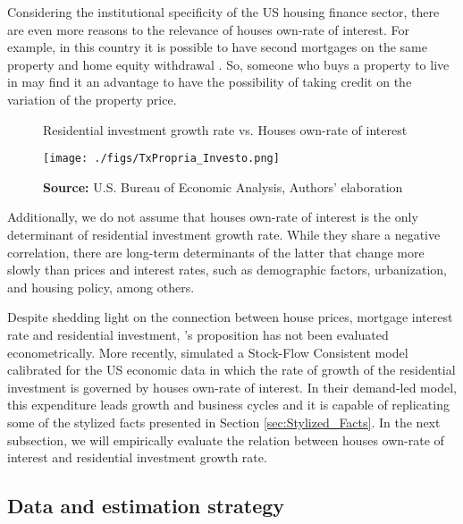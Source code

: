 \documentclass[12pt, a4paper]{article}
\begin{document}
Considering the institutional specificity of the US housing finance sector, there are even more reasons to the relevance of houses own-rate of interest.
For example, in this country it is possible to have second mortgages on the same property and home equity withdrawal \cite{green_2014_International}.
So, someone who buys a property to live in may find it an advantage to have the possibility of taking credit on the variation of the property price.


\begin{figure}[htb]
	\centering
	\caption{Residential investment growth rate vs. Houses own-rate of interest}
	\label{propria_investo}
	\texttt{[image: ./figs/TxPropria\_Investo.png]}
	\caption*{\textbf{Source:} U.S. Bureau of Economic Analysis, Authors' elaboration}
\end{figure}

Additionally, we do not assume that houses own-rate of interest is the only determinant of residential investment growth rate.
While they share a negative correlation, there are long-term determinants of the latter that change more slowly than prices and interest rates, such as demographic factors, urbanization, and housing policy, among others.

Despite shedding light on the connection between house prices, mortgage interest rate and residential investment, \citeauthor*{teixeira_crescimento_2015}'s \citeyear{teixeira_crescimento_2015} proposition has not been evaluated econometrically.
More recently, \textcite{petrini_2021_TD} simulated a Stock-Flow Consistent model calibrated for the US economic data in which the rate of growth of the residential investment is governed by houses own-rate of interest.
In their demand-led model, this expenditure leads growth and business cycles and it is capable of replicating some of the stylized facts presented in Section \ref{sec:Stylized_Facts}.
In the next subsection, we will empirically evaluate the relation between houses own-rate of interest and residential investment growth rate.


\subsection{Data and estimation strategy}
\label{sec:org0a7aaa3}
\label{sec:estimation}
\end{document}
